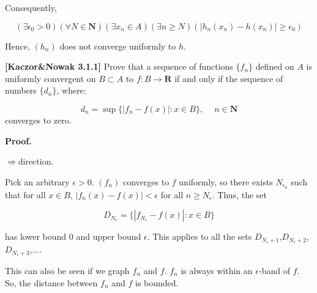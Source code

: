 \documentclass[10pt]{article}
\begin{document}
Consequently,


\begin{equation*}
( \exists \epsilon _{0}  >0)( \forall N\in \mathbf{N})( \exists x_{n} \in A)( \exists n\geq N)( |h_{n}( x_{n}) -h( x_{n}) |\geq \epsilon _{0})
\end{equation*}


Hence, $\displaystyle ( h_{n})$ does not converge uniformly to $\displaystyle h$.



\textbf{[Kaczor\&Nowak 3.1.1]} Prove that a sequence of functions $\displaystyle \{f_{n}\}$ defined on $\displaystyle A$ is uniformly convergent on $\displaystyle B\subset A$ to $\displaystyle f:B\rightarrow \mathbf{R}$ if and only if the sequence of numbers $\displaystyle \{d_{n}\}$, where:




\begin{equation*}
d_{n} =\sup \{|f_{n} -f( x) |:x\in B\} ,\ \quad n\in \mathbf{N}
\end{equation*}
converges to zero.



\textbf{Proof.}



$\displaystyle \Longrightarrow $direction.



Pick an arbitrary $\displaystyle \epsilon  >0$. $\displaystyle ( f_{n})$ converges to $\displaystyle f$ uniformly, so there exists $\displaystyle N_{\epsilon _{0}}$ such that for all $\displaystyle x\in B$, $\displaystyle |f_{n}( x) -f( x) |< \epsilon $ for all $\displaystyle n\geq N_{\epsilon }$. Thus, the set


\begin{equation*}
D_{N_{\epsilon }} =\{|f_{N_{\epsilon }} -f( x) |:x\in B\}
\end{equation*}


has lower bound $\displaystyle 0$ and upper bound $\displaystyle \epsilon $. This applies to all the sets $\displaystyle D_{N_{\epsilon } +1}$,$\displaystyle D_{N_{\epsilon } +2}$,$\displaystyle D_{N_{\epsilon } +3}$,.... \ 



This can also be seen if we graph $\displaystyle f_{n}$ and $\displaystyle f$. $\displaystyle f_{n}$ is always within an $\displaystyle \epsilon $-band of $\displaystyle f$. So, the distance between $\displaystyle f_{n}$ and $\displaystyle f$ is bounded. 
\end{document}
